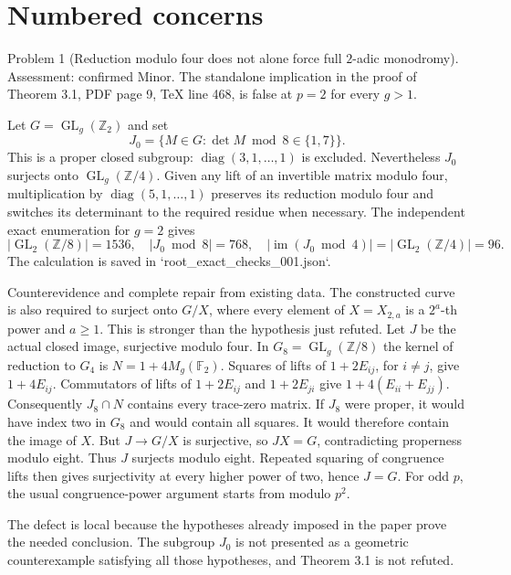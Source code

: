 \documentclass[10pt]{article}
\begin{document}
\section*{Numbered concerns}
Problem 1 (Reduction modulo four does not alone force full \(2\)-adic monodromy).  Assessment: confirmed Minor. The standalone implication in the proof of Theorem 3.1, PDF page 9, TeX line 468, is false at \(p=2\) for every \(g>1\).\par
Let \(G=\operatorname{GL}_g(\mathbb Z_2)\) and set \[J_0=\{M\in G:\det M\bmod8\in\{1,7\}\}.\] This is a proper closed subgroup: \(\operatorname{diag}(3,1,\ldots,1)\) is excluded. Nevertheless \(J_0\) surjects onto \(\operatorname{GL}_g(\mathbb Z/4)\). Given any lift of an invertible matrix modulo four, multiplication by \(\operatorname{diag}(5,1,\ldots,1)\) preserves its reduction modulo four and switches its determinant to the required residue when necessary. The independent exact enumeration for \(g=2\) gives \[|\operatorname{GL}_2(\mathbb Z/8)|=1536,\quad |J_0\bmod8|=768,\quad
 |\operatorname{im}(J_0\bmod4)|=|\operatorname{GL}_2(\mathbb Z/4)|=96.\] The calculation is saved in `root\_exact\_checks\_001.json`.\par
Counterevidence and complete repair from existing data. The constructed curve is also required to surject onto \(G/X\), where every element of \(X=X_{2,a}\) is a \(2^a\)-th power and \(a\geq1\). This is stronger than the hypothesis just refuted. Let \(J\) be the actual closed image, surjective modulo four. In \(G_8=\operatorname{GL}_g(\mathbb Z/8)\) the kernel of reduction to \(G_4\) is \(N=1+4M_g(\mathbb F_2)\). Squares of lifts of \(1+2E_{ij}\), for \(i\ne j\), give \(1+4E_{ij}\). Commutators of lifts of \(1+2E_{ij}\) and \(1+2E_{ji}\) give \(1+4(E_{ii}+E_{jj})\). Consequently \(J_8\cap N\) contains every trace-zero matrix. If \(J_8\) were proper, it would have index two in \(G_8\) and would contain all squares. It would therefore contain the image of \(X\). But \(J\to G/X\) is surjective, so \(JX=G\), contradicting properness modulo eight. Thus \(J\) surjects modulo eight. Repeated squaring of congruence lifts then gives surjectivity at every higher power of two, hence \(J=G\). For odd \(p\), the usual congruence-power argument starts from modulo \(p^2\).\par
The defect is local because the hypotheses already imposed in the paper prove the needed conclusion. The subgroup \(J_0\) is not presented as a geometric counterexample satisfying all those hypotheses, and Theorem 3.1 is not refuted.\par
\end{document}
